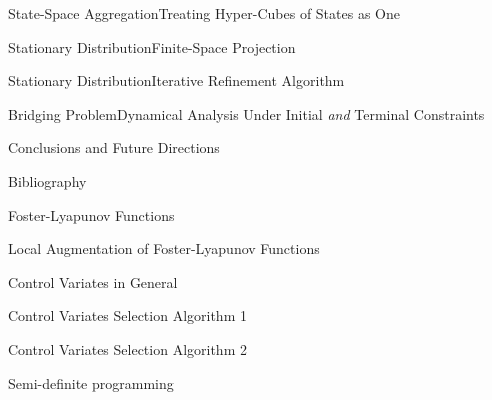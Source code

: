 \documentclass{beamer}
\begin{document}
\begin{frame}{State-Space Aggregation}{Treating Hyper-Cubes of States as One}
\end{frame}

\begin{frame}{Stationary Distribution}{Finite-Space Projection}
\end{frame}

\begin{frame}{Stationary Distribution}{Iterative Refinement Algorithm}
\end{frame}

\begin{frame}{Bridging Problem}{Dynamical Analysis Under Initial \emph{and} Terminal Constraints}
\end{frame}

\begin{frame}{Conclusions and Future Directions}
\end{frame}

\begin{frame}{Bibliography}
\end{frame}


\begin{frame}{Foster-Lyapunov Functions}
\end{frame}

\begin{frame}{Local Augmentation of Foster-Lyapunov Functions}
\end{frame}

\begin{frame}{Control Variates in General}
\end{frame}

\begin{frame}{Control Variates Selection Algorithm 1}
\end{frame}

\begin{frame}{Control Variates Selection Algorithm 2}
\end{frame}

\begin{frame}{Semi-definite programming}
\end{frame}
\end{document}
